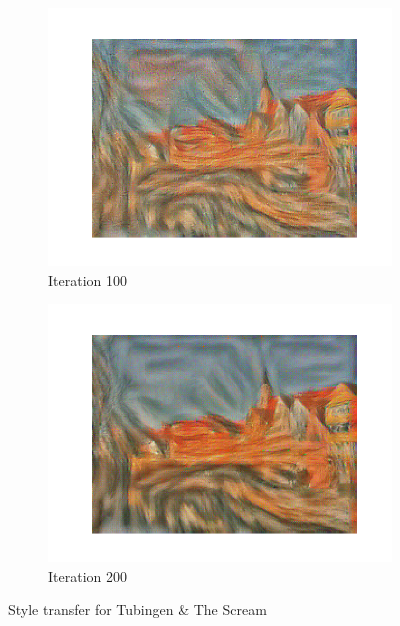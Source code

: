 \documentclass[12pt]{article}
\begin{document}
\begin{figure}[htbp]
\begin{subfigure}[t]{0.48\textwidth}
        \centering
        \includegraphics[trim={3in 0in 3in 0in},scale=0.45]{./Homework2/output/hw2p2_fig07.png}
        \caption{Iteration 100}
    \label{hw2p2g}
    \end{subfigure}
    \begin{subfigure}[t]{0.48\textwidth}
        \centering
        \includegraphics[trim={3in 0in 3in 0in},scale=0.7]{./Homework2/output/hw2p2_fig08.png}
        \caption{Iteration 200}
    \label{hw2p2h}
    \end{subfigure}
    \caption{Style transfer for Tubingen \& The Scream}
\end{figure}
\end{document}
